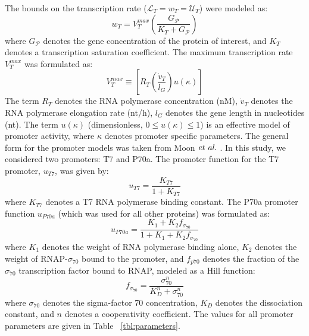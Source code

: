 \documentclass[journal=asbcd6,manuscript=article]{achemso}
\begin{document}
The bounds on the transcription rate ($\mathcal{L}_{T}=w_{T}=\mathcal{U}_{T}$) were modeled as:
\begin{equation}
	w_{T} = V_{T}^{max}\left(\frac{G_{\mathcal{P}}}{K_{T}+G_{\mathcal{P}}}\right)
\end{equation}
where $G_{\mathcal{P}}$ denotes the gene concentration of the protein of interest, and $K_{T}$ denotes a transcription saturation coefficient.
The maximum transcription rate $V_{T}^{max}$ was formulated as:
\begin{equation}
	V_{T}^{max} \equiv \left[R_{T}\left(\frac{\dot{v}_{T}}{l_{G}}\right)u\left(\kappa\right)\right]
\end{equation}
The term $R_{T}$ denotes the RNA polymerase concentration (nM),
$\dot{v}_{T}$ denotes the RNA polymerase elongation rate (nt/h),
$l_{G}$ denotes the gene length in nucleotides (nt).
The term $u\left(\kappa\right)$ (dimensionless, $0\leq u\left(\kappa\right)\leq 1$)
is an effective model of promoter activity, where $\kappa$ denotes promoter specific parameters.
The general form for the promoter models was taken from Moon $\emph{et~al.}$ \cite{Moon:2012ab}.
In this study, we considered two promoters: T7 and P70a.
The promoter function for the T7 promoter, $u_{T7}$, was given by:
\begin{equation}
	u_{T7} = \frac{K_{T7}}{1 + K_{T7}}
\end{equation}
where $K_{T7}$ denotes a T7 RNA polymerase binding constant.
The P70a promoter function $u_{P70a}$ (which was used for all other proteins) was formulated as:
\begin{equation}
	u_{P70a} = \frac{K_{1}+K_{2}f_{\sigma_{70}}}{1 + K_{1}+K_{2}f_{\sigma_{70}}}
\end{equation}
where $K_{1}$ denotes the weight of RNA polymerase binding alone,
$K_{2}$ denotes the weight of RNAP-$\sigma_{70}$ bound to the promoter,
and $f_{p70}$ denotes the fraction of the $\sigma_{70}$ transcription factor bound to RNAP, modeled as a Hill function:
\begin{equation}
	f_{\sigma_{70}} = \frac{\sigma_{70}^{n}}{K_{D}^{n} + \sigma_{70}^{n}}
\end{equation}
where $\sigma_{70}$ denotes the sigma-factor 70 concentration, $K_{D}$ denotes the dissociation constant, and $n$ denotes a cooperativity coefficient.
The values for all promoter parameters are given in Table ~\ref{tbl:parameters}.
\end{document}
